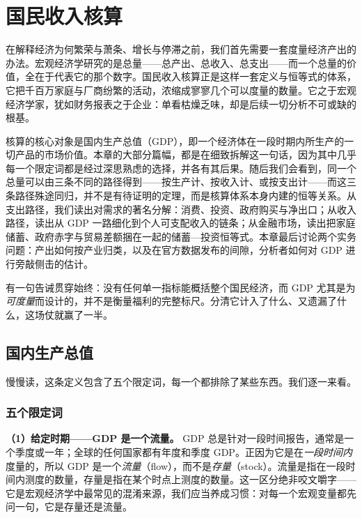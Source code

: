\chapter{国民收入核算}
\label{ch:accounts}

在解释经济为何繁荣与萧条、增长与停滞之前，我们首先需要一套度量经济产出的办法。宏观经济学研究的是总量——总产出、总收入、总支出——而一个总量的价值，全在于代表它的那个数字。国民收入核算正是这样一套定义与恒等式的体系，它把千百万家庭与厂商纷繁的活动，浓缩成寥寥几个可以度量的数量。它之于宏观经济学家，犹如财务报表之于企业：单看枯燥乏味，却是后续一切分析不可或缺的根基。

核算的核心对象是国内生产总值（GDP），即一个经济体在一段时期内所生产的一切产品的市场价值。本章的大部分篇幅，都是在细致拆解这一句话，因为其中几乎每一个限定词都是经过深思熟虑的选择，并各有其后果。随后我们会看到，同一个总量可以由三条不同的路径得到——按生产计、按收入计、或按支出计——而这三条路径殊途同归，并不是有待证明的定理，而是核算体系本身内建的恒等关系。从支出路径，我们读出对需求的著名分解：消费、投资、政府购买与净出口；从收入路径，读出从 GDP 一路细化到个人可支配收入的链条；从金融市场，读出把家庭储蓄、政府赤字与贸易差额捆在一起的储蓄—投资恒等式。本章最后讨论两个实务问题：产出如何按产业归类，以及在官方数据发布的间隙，分析者如何对 GDP 进行旁敲侧击的估计。

有一句告诫贯穿始终：没有任何单一指标能概括整个国民经济，而 GDP 尤其是为\emph{可度量}而设计的，并不是衡量福利的完整标尺。分清它计入了什么、又遗漏了什么，这场仗就赢了一半。

\section{国内生产总值}


慢慢读，这条定义包含了五个限定词，每一个都排除了某些东西。我们逐一来看。

\subsection{五个限定词}

\textbf{（1）给定时期——GDP 是一个流量。} GDP 总是针对一段时间报告，通常是一个季度或一年；全球的任何国家都有年度和季度 GDP。正因为它是在\emph{一段时间内}度量的，所以 GDP 是一个\emph{流量}（flow），而不是\emph{存量}（stock）。流量是指在一段时间内测度的数量，存量是指在某个时点上测度的数量。这一区分绝非咬文嚼字——它是宏观经济学中最常见的混淆来源，我们应当养成习惯：对每一个宏观变量都先问一句，它是存量还是流量。

